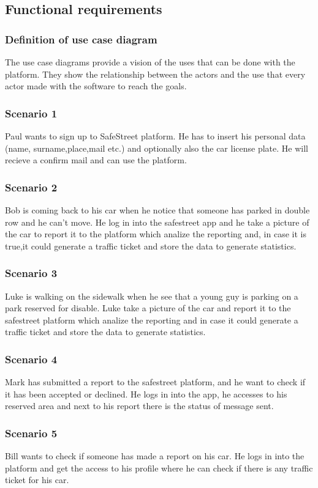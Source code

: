 \subsection{Functional requirements}
\subsubsection{Definition of use case diagram}
The use case diagrams provide a vision of the uses that can be done with the platform. They show the relationship between the actors and the use that every actor made with the software to reach the goals.

\subsubsection{Scenario 1}
Paul wants to sign up to SafeStreet platform. He has to insert his personal data (name, surname,place,mail etc.) and optionally also the car license plate. He will recieve a confirm mail and can use the platform.
\subsubsection{Scenario 2}
Bob is coming back to his car when he notice that someone has parked in double row and he can’t move. He log in into the safestreet app and he take a picture of the car to report it to the platform which analize the reporting and, in case it is true,it  could generate a traffic ticket and store the data to generate statistics.

\subsubsection{Scenario 3}
Luke is walking on the sidewalk when he see that a young guy is parking on a park reserved for disable.
Luke take a picture of the car and report it to the safestreet platform which analize the reporting and in case it could generate a traffic ticket and store the data to generate statistics.

\subsubsection{Scenario 4}
Mark has submitted a report to the safestreet platform, and he want to check if it has been accepted or declined.
He logs in into the app, he accesses to his reserved area and next to his report there is the status of message sent.

\subsubsection{Scenario 5}
Bill wants to check if someone has made a report on his car. He logs in into the platform and get the access to his profile where he can check if there is any traffic ticket for his car.

